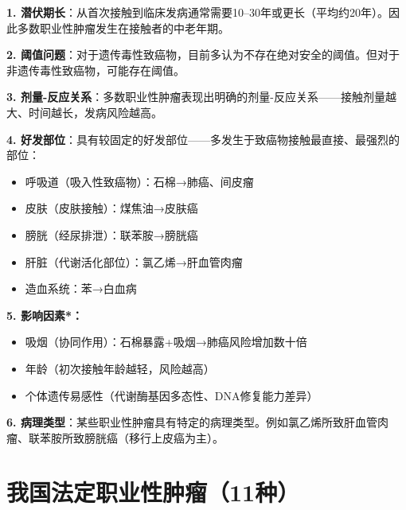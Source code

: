 \begin{keybox}
\textbf{1. 潜伏期长}：从首次接触到临床发病通常需要10--30年或更长（平均约20年）。因此多数职业性肿瘤发生在接触者的中老年期。

\textbf{2. 阈值问题}：对于遗传毒性致癌物，目前多认为不存在绝对安全的阈值。但对于非遗传毒性致癌物，可能存在阈值。

\textbf{3. 剂量-反应关系}：多数职业性肿瘤表现出明确的剂量-反应关系——接触剂量越大、时间越长，发病风险越高。

\textbf{4. 好发部位}：具有较固定的好发部位——多发生于致癌物接触最直接、最强烈的部位：
\begin{itemize}[leftmargin=*]
    \item 呼吸道（吸入性致癌物）：石棉→肺癌、间皮瘤
    \item 皮肤（皮肤接触）：煤焦油→皮肤癌
    \item 膀胱（经尿排泄）：联苯胺→膀胱癌
    \item 肝脏（代谢活化部位）：氯乙烯→肝血管肉瘤
    \item 造血系统：苯→白血病
\end{itemize}

\textbf{5. 影响因素*：}
\begin{itemize}[leftmargin=*]
    \item 吸烟（协同作用）：石棉暴露+吸烟→肺癌风险增加数十倍
    \item 年龄（初次接触年龄越轻，风险越高）
    \item 个体遗传易感性（代谢酶基因多态性、DNA修复能力差异）
\end{itemize}

\textbf{6. 病理类型}：某些职业性肿瘤具有特定的病理类型。例如氯乙烯所致肝血管肉瘤、联苯胺所致膀胱癌（移行上皮癌为主）。
\end{keybox}

\section{我国法定职业性肿瘤（11种）}

